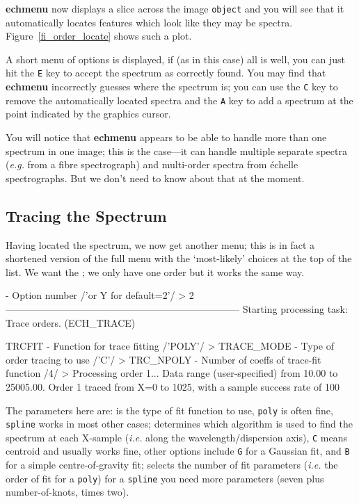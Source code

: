 \documentclass[twoside,11pt]{starlink}
\providecommand{\scspec}[2]{#1}
\begin{document}
\textbf{echmenu} now displays a slice across the image \verb+object+ and you
will see that it automatically locates features which look like they may be
spectra.  \scspec{Figure~\ref{fi_order_locate}}{The figure above} shows
such a plot.

A short menu of options is displayed, if (as in this case) all is well,
you can just hit the \verb+E+ key to accept the spectrum as correctly found.
You may find that \textbf{echmenu} incorrectly guesses where the spectrum is;
you can use the \verb+C+ key to remove the automatically located spectra and
the \verb+A+ key to add a spectrum at the point indicated by the graphics
cursor.

You will notice that \textbf{echmenu} appears to be able to handle more than
one spectrum in one image; this is the case\scspec{---}{ - }it can handle
multiple separate spectra ({\it{e.g.}} from a fibre spectrograph) and
multi-order spectra from \'{e}chelle spectrographs.  But we don't need to
know about that at the moment.


\subsection{Tracing the Spectrum}

Having located the spectrum, we now get another menu; this is in fact
a shortened version of the full menu with the `most-likely' choices at
the top of the list.
We want the ;
we only have one order but it works the same way.

{
\scspec{\small}{ }
\begin{terminalv}
    - Option number /'or Y for default=2'/ > 2
    ------------------------------------------------------------------------
    Starting processing task:     Trace orders.                  (ECH_TRACE)

   TRCFIT - Function for trace fitting /'POLY'/ >
   TRACE_MODE - Type of order tracing to use /'C'/ >
   TRC_NPOLY - Number of coeffs of trace-fit function /4/ >
    Processing order 1...
    Data range (user-specified) from     10.00 to  25005.00.
    Order 1 traced from X=0 to 1025, with a sample success rate of 100%
\end{terminalv}
}

The parameters here are:
 is the type of fit function to use,
\verb+poly+ is often fine, \verb+spline+ works in most other cases;
 determines which algorithm
is used to find the spectrum at each X-sample ({\it{i.e.}} along the
wavelength/dispersion axis), \verb+C+ means centroid and
usually works fine, other options include \verb+G+ for a Gaussian fit, and
\verb+B+ for a simple centre-of-gravity fit;
 selects the number of
fit parameters ({\it{i.e.}} the order of fit for a \verb+poly+) for
a \verb+spline+ you need more parameters (seven plus
number-of-knots, times two).
\end{document}
